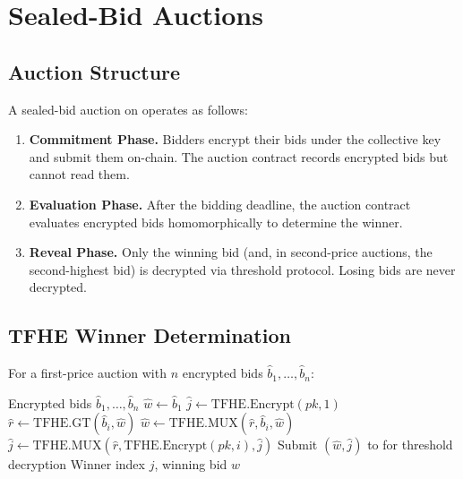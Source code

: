 \section{Sealed-Bid Auctions}

\label{sec:auctions}

\subsection{Auction Structure}

A sealed-bid auction on \Zoo{} operates as follows:

\begin{enumerate}
    \item \textbf{Commitment Phase.} Bidders encrypt their bids under the collective \FHE{} key and submit them on-chain. The auction contract records encrypted bids but cannot read them.
    \item \textbf{Evaluation Phase.} After the bidding deadline, the auction contract evaluates encrypted bids homomorphically to determine the winner.
    \item \textbf{Reveal Phase.} Only the winning bid (and, in second-price auctions, the second-highest bid) is decrypted via \TChain{} threshold protocol. Losing bids are never decrypted.
\end{enumerate}

\subsection{TFHE Winner Determination}

For a first-price auction with $n$ encrypted bids $\hat{b}_1, \ldots, \hat{b}_n$:

\begin{algorithm}
\caption{Encrypted First-Price Auction}
\begin{algorithmic}[1]
\REQUIRE Encrypted bids $\hat{b}_1, \ldots, \hat{b}_n$
\STATE $\hat{w} \leftarrow \hat{b}_1$ 
\STATE $\hat{j} \leftarrow \text{TFHE.Encrypt}(pk, 1)$ 
    \STATE $\hat{r} \leftarrow \text{TFHE.GT}(\hat{b}_i, \hat{w})$
    \STATE $\hat{w} \leftarrow \text{TFHE.MUX}(\hat{r}, \hat{b}_i, \hat{w})$
    \STATE $\hat{j} \leftarrow \text{TFHE.MUX}(\hat{r}, \text{TFHE.Encrypt}(pk, i), \hat{j})$
\ENDFOR
\STATE Submit $(\hat{w}, \hat{j})$ to \TChain{} for threshold decryption
\RETURN Winner index $j$, winning bid $w$
\end{algorithmic}
\end{algorithm}

